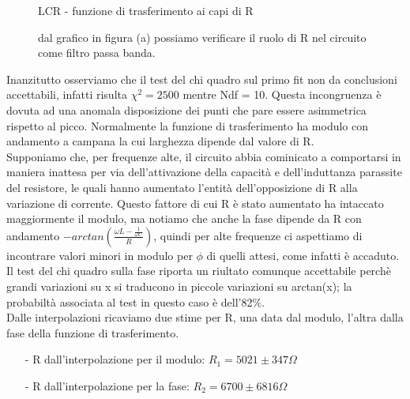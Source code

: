 \documentclass{article}
\theoremstyle{definition}
\begin{document}
\begin{figure}[!h]
\caption{LCR - funzione di trasferimento ai capi di R}

\caption*{dal grafico in figura (a) possiamo verificare il ruolo di R nel circuito come filtro passa banda.}
\label{fig:RLC_su_R}
\end{figure}

\noindent Inanzitutto osserviamo che il test del chi quadro sul primo fit non da conclusioni accettabili, infatti risulta \(\chi^{2} = 2500\) mentre Ndf = 10. Questa incongruenza è dovuta ad una anomala disposizione dei punti che pare essere asimmetrica rispetto al picco. Normalmente la funzione di trasferimento ha modulo con andamento a campana la cui larghezza dipende dal valore di R. \\
Supponiamo che, per frequenze alte, il circuito abbia cominicato a comportarsi in maniera inattesa per via dell'attivazione della capacità e dell'induttanza parassite del resistore, le quali hanno aumentato l'entità dell'opposizione di R alla variazione di corrente. Questo fattore di cui R è stato aumentato ha intaccato maggiormente il modulo, ma notiamo che anche la fase dipende da R con andamento \(-arctan\left(\frac{\omega L - \frac{1}{\omega C}}{R}\right)\), quindi per alte frequenze ci aspettiamo di incontrare valori minori in modulo per \(\phi\) di quelli attesi, come infatti è accaduto. \\
\noindent Il test del chi quadro sulla fase riporta un riultato  comunque accettabile perchè grandi variazioni su x si traducono in piccole variazioni su arctan(x); la probabiltà associata al test in questo caso è dell'82\%. \\

\noindent Dalle interpolazioni ricaviamo due stime per R, una data dal modulo, l'altra dalla fase della funzione di trasferimento.
\begin{enumerate}
    \item[-] R dall'interpolazione per il modulo: \(R_{1}=5021 \pm 347 \Omega\)
    \item[-] R dall'interpolazione per la fase: \(R_{2}= 6700 \pm 6816 \Omega\)

\end{enumerate}
\end{document}
